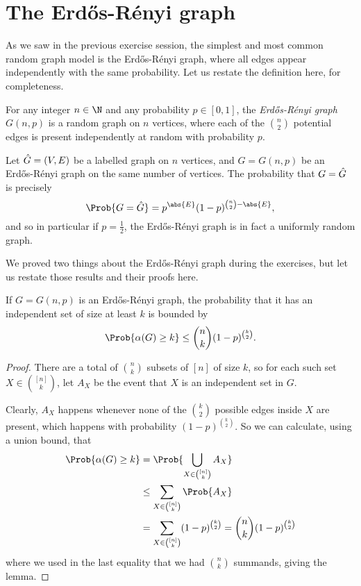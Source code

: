 \documentclass[nobib]{tufte-handout}
\begin{document}
\section{The Erd\H{o}s-Rényi graph}

As we saw in the previous exercise session, the simplest and most common random graph model is the Erd\H{o}s-Rényi graph, where all edges appear independently with the same probability. Let us restate the definition here, for completeness.

\begin{definition}
  For any integer $n \in \N$ and any probability $p \in [0,1]$, the \emph{Erd\H{o}s-Rényi graph} $G(n,p)$ is a random graph on $n$ vertices, where each of the $\binom{n}{2}$ potential edges is present independently at random with probability $p$.
\end{definition}

\begin{proposition}
  Let $\Hat G = (V,E)$ be a labelled graph on $n$ vertices, and $G = G(n,p)$ be an Erd\H{o}s-Rényi graph on the same number of vertices. The probability that $G = \Hat G$ is precisely
  $$\Prob{G = \Hat G} = p^{\abs{E}}(1-p)^{\binom{n}{2} - \abs{E}},$$
  and so in particular if $p = \frac{1}{2}$, the Erd\H{o}s-Rényi graph is in fact a uniformly random graph.
\end{proposition}

We proved two things about the Erd\H{o}s-Rényi graph during the exercises, but let us restate those results and their proofs here.

\begin{lemma}\label{lemma:er_independence_number}
  If $G = G(n,p)$ is an Erd\H{o}s-Rényi graph, the probability that it has an independent set of size at least $k$ is bounded by
  $$\Prob{\alpha(G) \geq k} \leq \binom{n}{k}(1-p)^{\binom{k}{2}}.$$

  \begin{proof}
    There are a total of $\binom{n}{k}$ subsets of $[n]$ of size $k$, so for each such set $X \in \binom{[n]}{k}$, let $A_X$ be the event that $X$ is an independent set in $G$.

    Clearly, $A_X$ happens whenever none of the $\binom{k}{2}$ possible edges inside $X$ are present, which happens with probability $(1-p)^{\binom{k}{2}}$. So we can calculate, using a union bound, that
    \begin{align*}
      \Prob{\alpha(G) \geq k} &= \Prob{\bigcup_{X \in \binom{[n]}{k}} A_X}\\
      &\leq \sum_{X \in \binom{[n]}{k}} \Prob{A_X}\\
      &= \sum_{X \in \binom{[n]}{k}} (1-p)^{\binom{k}{2}} = \binom{n}{k}(1-p)^{\binom{k}{2}}
    \end{align*}
    where we used in the last equality that we had $\binom{n}{k}$ summands, giving the lemma.
  \end{proof}
\end{lemma}
\end{document}
